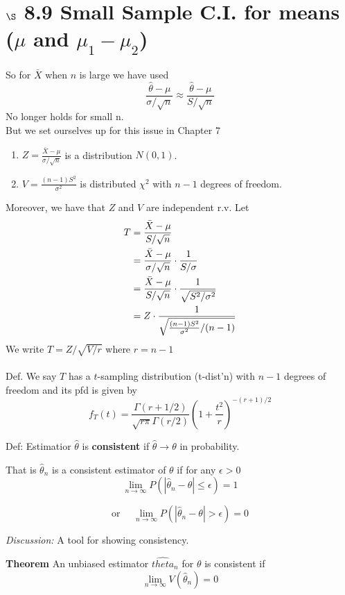 \documentclass[12pt]{article}
\newcommand{\pars}[1]{\left( {#1} \right) }
\newcommand{\xbar}{\bar{X}}
\newcommand{\limn}{\lim_{n\to\infty}}
\renewcommand{\over}[1]{\frac{1}{{#1}}}
\renewcommand{\P}[1]{P \left( {#1} \right) }
\newcommand{\nl}{\vspace{0.1in}\noindent}
\newcommand{\nnl}{\vspace{0.2in}\noindent}
\begin{document}
           \section*{$\S$ 8.9 Small Sample C.I. for means ($\mu$ and $\mu_1 - \mu_2$)}
           So for $\xbar$ when $n$ is large we have used
           $$\frac{\hat{\theta}-\mu}{\sigma/\sqrt{n}} \approx \frac{\hat{\theta}-\mu}{S/\sqrt{n}}$$
           No longer holds for small n.\\
           But we set ourselves up for this issue in Chapter 7
           \begin{enumerate}
               \item $Z = \frac{\bar{X}-\mu}{\sigma/\sqrt{n}}$ is a distribution $N(0,1)$.
               \item $V = \frac{(n-1)S^2}{\sigma^2}$ is distributed $\chi^2$ with $n-1$ degrees of freedom.
           \end{enumerate}
            Moreover, we have that $Z$ and $V$ are independent r.v. Let
            \begin{align}
                T &= \frac{\xbar - \mu}{S/\sqrt{n}}\notag\\ &= \frac{\xbar - \mu}{\sigma/\sqrt{n}} \cdot \over{S/\sigma} \notag\\ &= \frac{\xbar-\mu}{S/\sqrt{n}} \cdot \over{\sqrt{S^2/\sigma^2}} \notag\\
                &= Z \cdot \over{\sqrt{\frac{(n-1)S^2}{\sigma^2}/(n-1)}}\notag
            \end{align}
            We write $T = Z/\sqrt{V/r}$ where $r = n-1$\\
            \\Def. We say $T$ has a $t$-sampling distribution (t-dist'n) with $n-1$ degrees of freedom and its pfd is given by
            $$f_T(t) = \frac{\Gamma(r+1/2)}{\sqrt{r\pi}\Gamma(r/2)} \pars{1 + \frac{t^2}{r}}^{-(r+1)/2}$$
           
           
           Def: Estimatior $\hat{\theta}$ is \textbf{consistent} if $\hat{\theta} \to \theta$ in probability.

\nl That is $\hat{\theta}_n$ is a consistent estimator of $\theta$ if for any $\epsilon > 0$
$$\limn \P{\left| \hat{\theta}_n - \theta \right| \leq \epsilon} = 1$$

$$\text{or } \quad \limn \P{\left| \hat{\theta}_n - \theta \right| > \epsilon} = 0$$

\nnl \emph{Discussion:} A tool for showing consistency.

\nl \textbf{Theorem} An unbiased estimator $\hat{theta}_n$ for $\theta$ is consistent if
$$\limn V(\hat{\theta}_n) = 0$$
\end{document}

